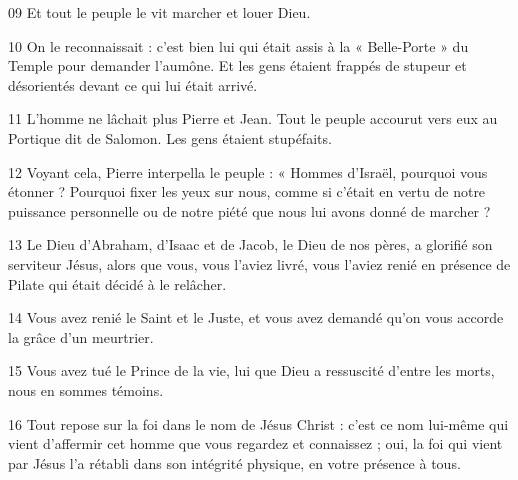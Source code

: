 
09 Et tout le peuple le vit marcher et louer Dieu.

10 On le reconnaissait : c’est bien lui qui était assis à la « Belle-Porte » du Temple pour demander l’aumône. Et les gens étaient frappés de stupeur et désorientés devant ce qui lui était arrivé.

11 L’homme ne lâchait plus Pierre et Jean. Tout le peuple accourut vers eux au Portique dit de Salomon. Les gens étaient stupéfaits.

12 Voyant cela, Pierre interpella le peuple : « Hommes d’Israël, pourquoi vous étonner ? Pourquoi fixer les yeux sur nous, comme si c’était en vertu de notre puissance personnelle ou de notre piété que nous lui avons donné de marcher ?

13 Le Dieu d’Abraham, d’Isaac et de Jacob, le Dieu de nos pères, a glorifié son serviteur Jésus, alors que vous, vous l’aviez livré, vous l’aviez renié en présence de Pilate qui était décidé à le relâcher.

14 Vous avez renié le Saint et le Juste, et vous avez demandé qu’on vous accorde la grâce d’un meurtrier.

15 Vous avez tué le Prince de la vie, lui que Dieu a ressuscité d’entre les morts, nous en sommes témoins.

16 Tout repose sur la foi dans le nom de Jésus Christ : c’est ce nom lui-même qui vient d’affermir cet homme que vous regardez et connaissez ; oui, la foi qui vient par Jésus l’a rétabli dans son intégrité physique, en votre présence à tous.